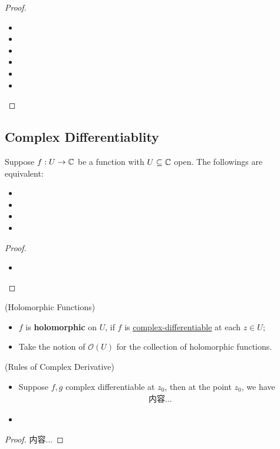 \documentclass[Total.tex]{subfiles}
\begin{document}
				\begin{proof}
					\begin{itemize}
						\item 
						\item 
						\item 
						\item 
						\item 
						\item 
					\end{itemize}
				\end{proof}
			\subsection{Complex Differentiablity}
				\begin{proposition}
					Suppose $f:U\rightarrow \mathbb{C}$ be a function with $U\subseteq\mathbb{C}$ open. The followings are equivalent:
					\begin{itemize}
						\item 
						\item 
						\item 
						\item 
					\end{itemize}
				\end{proposition}
				\begin{proof}
					\begin{itemize}
						\item 
					\end{itemize}
				\end{proof}
				
				\begin{Def}
					(Holomorphic Functions)
					\begin{itemize}
						\item $f$ is \textbf{holomorphic} on $U$, if $f$ is \underline{complex-differentiable} at each $z\in U$;
						\item Take the notion of $\mathcal{O}(U)$ for the collection of holomorphic functions.
					\end{itemize}
				\end{Def}
				
				\begin{proposition}
					(Rules of Complex Derivative) \begin{itemize}
						\item Suppose $f,g$ complex differentiable at $z_0$, then at the point $z_0$, we have
						\begin{gather*}
							内容...
						\end{gather*}
						\item 
					\end{itemize}
				\end{proposition}
				\begin{proof}
					内容...
				\end{proof}
\end{document}
